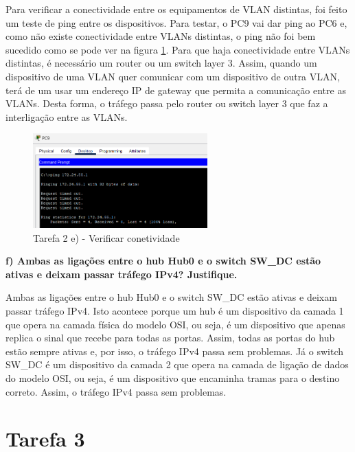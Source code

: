 \documentclass[11pt,english, openright, oneside]{book}
\begin{document}
Para verificar a conectividade entre os equipamentos de VLAN distintas, foi
feito um teste de ping entre os dispositivos. Para testar, o PC9 vai dar ping ao
PC6 e, como não existe conectividade entre VLANs distintas, o ping não foi bem
sucedido como se pode ver na figura \ref{fig:2e}. Para que haja conectividade
entre VLANs distintas, é necessário um router ou um switch layer 3. Assim,
quando um dispositivo de uma VLAN quer comunicar com um dispositivo de outra
VLAN, terá de um usar um endereço IP de gateway que permita a comunicação entre
as VLANs. Desta forma, o tráfego passa pelo router ou switch layer 3 que faz a
interligação entre as VLANs.

\begin{figure}[H]
    \centering
    \includegraphics[width=0.6\textwidth]{imagens/Tarefa2/2.e.png}
    \caption{Tarefa 2 e) - Verificar conetividade}
    \label{fig:2e}
\end{figure}

\vspace{0.8cm}

\textbf{f) Ambas as ligações entre o hub Hub0 e o switch  SW\_DC estão ativas e deixam passar tráfego IPv4? Justifique.}
\vspace{0.2cm}

Ambas as ligações entre o hub Hub0 e o switch SW\_DC estão ativas e deixam
passar tráfego IPv4. Isto acontece porque um hub é um dispositivo da camada 1
que opera na camada física do modelo OSI, ou seja, é um dispositivo que apenas
replica o sinal que recebe para todas as portas. Assim, todas as portas do hub
estão sempre ativas e, por isso, o tráfego IPv4 passa sem problemas. Já o switch
SW\_DC é um dispositivo da camada 2 que opera na camada de ligação de dados do
modelo OSI, ou seja, é um dispositivo que encaminha tramas para o destino
correto. Assim, o tráfego IPv4 passa sem problemas.

\vspace{0.8cm}

\pagebreak


\section{Tarefa 3}
\vspace{0.2cm}
\end{document}

